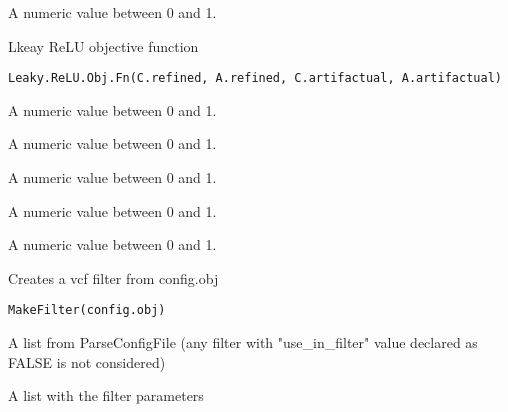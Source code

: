 \documentclass[letterpaper]{book}
\begin{document}
%
\begin{Value}
A numeric value between 0 and 1.
\end{Value}
%
\begin{Description}\relax
Lkeay ReLU objective function
\end{Description}
%
\begin{Usage}
\begin{verbatim}
Leaky.ReLU.Obj.Fn(C.refined, A.refined, C.artifactual, A.artifactual)
\end{verbatim}
\end{Usage}
%
\begin{Arguments}
\begin{ldescription}
\item[\code{C.refined}] A numeric value between 0 and 1.

\item[\code{A.refined}] A numeric value between 0 and 1.

\item[\code{C.artifactual}] A numeric value between 0 and 1.

\item[\code{A.artifactual}] A numeric value between 0 and 1.
\end{ldescription}
\end{Arguments}
%
\begin{Value}
A numeric value between 0 and 1.
\end{Value}
%
\begin{Description}\relax
Creates a vcf filter from config.obj
\end{Description}
%
\begin{Usage}
\begin{verbatim}
MakeFilter(config.obj)
\end{verbatim}
\end{Usage}
%
\begin{Arguments}
\begin{ldescription}
\item[\code{config.obj}] A list from ParseConfigFile
(any filter with "use\_in\_filter" value declared as FALSE is not considered)
\end{ldescription}
\end{Arguments}
%
\begin{Value}
A list with the filter parameters
\end{Value}
\end{document}
